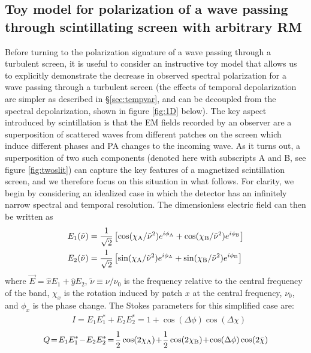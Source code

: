\documentclass[fleqn,usenatbib]{mnras}
\begin{document}
	\subsection{Toy model for polarization of a wave passing through scintillating screen with arbitrary RM}
	\label{sec:toymodelPi}
	Before turning to the polarization signature of a wave passing through a turbulent screen, it is useful to consider an instructive toy model that allows us to explicitly demonstrate the decrease in observed spectral polarization for a wave passing through a turbulent screen (the effects of temporal depolarization are simpler as described in \S \ref{sec:tempvar}, and can be decoupled from the spectral depolarization, shown in figure \ref{fig:1D} below). The key aspect introduced by scintillation is that the EM fields recorded by an observer are a superposition of scattered waves from different patches on the screen which induce different phases and PA changes to the incoming wave. As it turns out, a superposition of two such components (denoted here with subscripts A and B, see figure \ref{fig:twoslit}) can capture the key features of a magnetized scintillation screen, and we therefore focus on this situation in what follows. 
	For clarity, we begin by considering an idealized case in which the detector has an infinitely narrow spectral and temporal resolution. The dimensionless electric field can then be written as
	\begin{eqnarray}
		&   E_1(\tilde{\nu})=\frac{1}{\sqrt{2}}\left[\cos(\chi_{\rm A}/\tilde{\nu}^2)e^{i\phi_{\rm A}}+\cos(\chi_{\rm B}/\tilde{\nu}^2)e^{i\phi_{\rm B}} \right]\\
		&   E_2(\tilde{\nu})=\frac{1}{\sqrt{2}}\left[\sin(\chi_{\rm A}/\tilde{\nu}^2)e^{i\phi_{\rm A}}+\sin(\chi_{\rm B}/\tilde{\nu}^2)e^{i\phi_{\rm B}}\right]
	\end{eqnarray}
	where $\vec{E}=\hat{x}E_1+\hat{y}E_2$, $\tilde{\nu}\equiv\nu/\nu_0$ is the frequency relative to the central frequency of the band, $\chi_x$ is the rotation induced by patch $x$ at the central frequency, $\nu_0$, and $\phi_{x}$ is the phase change. The Stokes parameters for this simplified case are:
	\begin{eqnarray}
		\label{eq:Islit}
		& I= E_{1}E_{1}^*+E_{2}E_{2}^*=
		1+\cos(\Delta \phi)\cos(\Delta \chi) 
	\end{eqnarray}
	\begin{eqnarray}
		\label{eq:Qslit}
		Q\!=\! E_{1}E_{1}^*\!-\!E_{2}E_{2}^*\!=\!\frac{1}{2}\cos(2\chi_{\rm A})\!+\!\frac{1}{2}\cos(2\chi_{\rm B})\!+\!\cos(\Delta \phi)\cos(2 \bar{\chi})
	\end{eqnarray}
\end{document}
